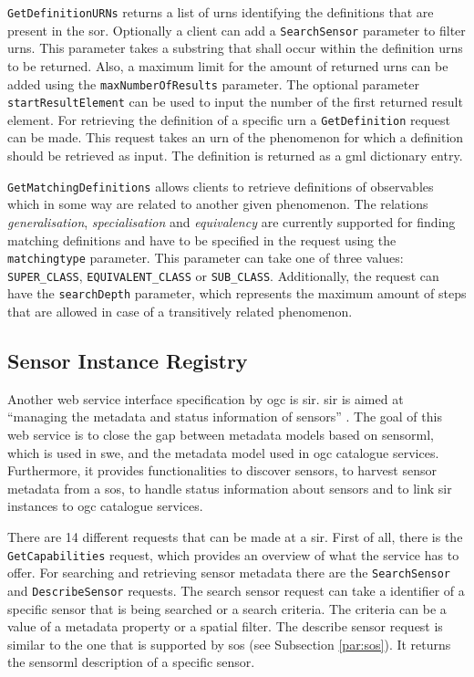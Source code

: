\begin{sloppypar}
\texttt{GetDefinitionURNs} returns a list of \acp{urn} identifying the definitions that are present in the \ac{sor}. Optionally a client can add a \texttt{SearchSensor} parameter to filter \acp{urn}. This parameter takes a substring that shall occur within the definition \acp{urn} to be returned. Also, a maximum limit for the amount of returned \acp{urn} can be added using the \texttt{maxNumberOfResults} parameter. The optional parameter \texttt{startResultElement} can be used to input the number of the first returned result element. For retrieving the definition of a specific \ac{urn} a \texttt{GetDefinition} request can be made. This request takes an \ac{urn} of the phenomenon for which a definition should be retrieved as input. The definition is returned as a \ac{gml} dictionary entry. 
\end{sloppypar}

\texttt{GetMatchingDefinitions} allows clients to retrieve definitions of observables which in some way are related to another given phenomenon. The relations \textit{generalisation}, \textit{specialisation} and \textit{equivalency} are currently supported for finding matching definitions \citep{SW:OGC4} and have to be specified in the request using the \texttt{matchingtype} parameter. This parameter can take one of three values: \texttt{SUPER\_CLASS}, \texttt{EQUIVALENT\_CLASS} or \texttt{SUB\_CLASS}. Additionally, the request can have the \texttt{searchDepth} parameter, which represents the maximum amount of steps that are allowed in case of a transitively related phenomenon.  

\subsection{Sensor Instance Registry}
\label{par:SIR}
Another web service interface specification by \ac{ogc} is \ac{sir}. \ac{sir} is aimed at \enquote{managing the metadata and status information of sensors} \cite[p. xii]{SW:OGC3}. The goal of this web service is to close the gap between metadata models based on \ac{sensorml}, which is used in \ac{swe}, and the metadata model used in \ac{ogc} catalogue services. Furthermore, it provides functionalities to discover sensors, to harvest sensor metadata from a \ac{sos}, to handle status information about sensors and to link \ac{sir} instances to \ac{ogc} catalogue services. 


There are 14 different requests that can be made at a \ac{sir}. First of all, there is the \texttt{GetCapabilities} request, which provides an overview of what the service has to offer. For searching and retrieving sensor metadata there are the \texttt{SearchSensor} and \texttt{DescribeSensor} requests. The search sensor request can take a identifier of a specific sensor that is being searched or a search criteria. The criteria can be a value of a metadata property or a spatial filter. The describe sensor request is similar to the one that is supported by \ac{sos} (see Subsection \ref{par:sos}). It returns the \ac{sensorml} description of a specific sensor. 

